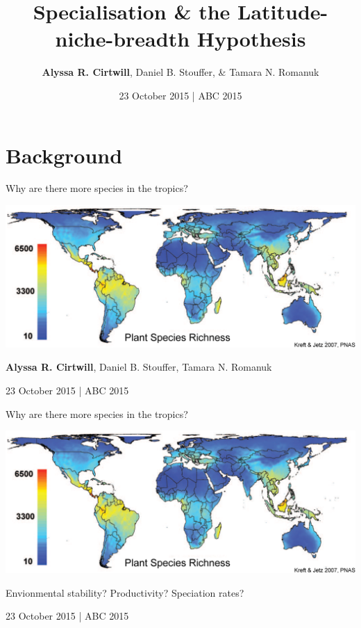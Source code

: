 \documentclass{beamer}
\title[Specialisation \& the Latitude-niche-breadth Hypothesis]
{Specialisation \& the Latitude-niche-breadth Hypothesis}
\author[A.R. Cirtwill, D.B. Stouffer, \& T.N. Romanuk]{\textbf{Alyssa R. Cirtwill}, Daniel B. Stouffer, \& Tamara N. Romanuk}
\institute[]
{
  Stouffer Lab\\
  School of Biological Sciences\\
  University of Canterbury\\
  Christchurch, New Zealand\\
  ~\\
  www.stoufferlab.org\\
}
\date[Short Occasion] 
{23 October 2015 | ABC 2015}
\begin{document}

\section*{Background}

  \begin{frame}{Why are there more species in the tropics?}

    \begin{center}
      \includegraphics*[width=.8\textwidth]{Figures/plant_richness.eps}

      \vspace{1cm}

    \textbf{Alyssa R. Cirtwill}, Daniel B. Stouffer, Tamara N. Romanuk

    \vspace{1cm}

    23 October 2015 | ABC 2015

    \end{center}
  \end{frame}


  \begin{frame}{Why are there more species in the tropics?}

    \begin{center}
      \includegraphics*[width=.8\textwidth]{Figures/plant_richness.eps}

      \vspace{1cm}

      Envionmental stability? 
      Productivity? 
      Speciation rates?

      \vspace{1cm}
      {\color{white} 23 October 2015 | ABC 2015}
    \end{center}
  \end{frame}
\end{document}
